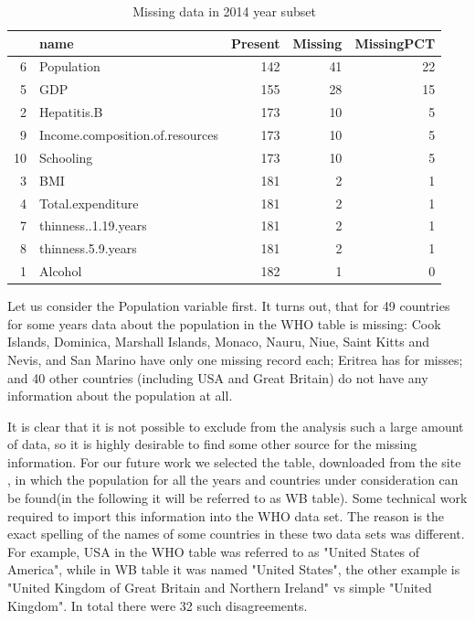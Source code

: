 \begin{table}[ht]
\centering
\begin{tabular}{rlrrr}
  \toprule
 & name & Present & Missing & MissingPCT \\ 
  \midrule
6 & Population & 142 &  41 &  22 \\ 
  5 & GDP & 155 &  28 &  15 \\ 
  2 & Hepatitis.B & 173 &  10 &   5 \\ 
  9 & Income.composition.of.resources & 173 &  10 &   5 \\ 
  10 & Schooling & 173 &  10 &   5 \\ 
  3 & BMI & 181 &   2 &   1 \\ 
  4 & Total.expenditure & 181 &   2 &   1 \\ 
  7 & thinness..1.19.years & 181 &   2 &   1 \\ 
  8 & thinness.5.9.years & 181 &   2 &   1 \\ 
  1 & Alcohol & 182 &   1 &   0 \\ 
   \bottomrule
\end{tabular}
\caption{Missing data in 2014 year subset}
\label{tab:missing}
\end{table}

Let us consider the Population variable first. It turns out, that for 49 countries for some years data about the population in the WHO table is missing: Cook Islands, Dominica, Marshall Islands, Monaco, Nauru, Niue, Saint Kitts and Nevis, and San Marino have only one missing record each; Eritrea has for misses; and 40 other countries (including USA and Great Britain) do not have any information about the population at all.

It is clear that it is not possible to exclude from the analysis such a large amount of data, so it is highly desirable to find some other source for the missing information. For our future work we selected the table, downloaded from the site \cite{WB}, in which the population for all the years and countries under consideration can be found(in the following it will be referred to as WB table). Some technical work required to import this information into the WHO data set. The reason is the exact spelling of the names of some countries in these two data sets was different. For example, USA in the WHO table was referred to as "United States of America", while in WB table it was named "United States", the other example is "United Kingdom of Great Britain and Northern Ireland" vs simple "United Kingdom".  In total there were 32 such disagreements.

